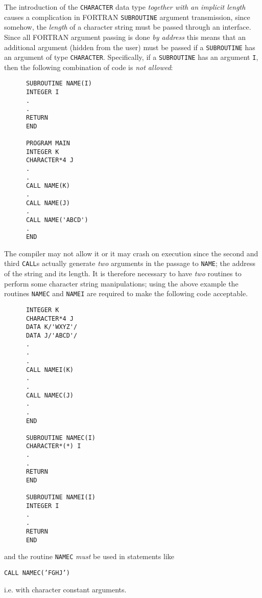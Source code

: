 The introduction of the {\tt CHARACTER}
data type {\em together with an implicit length} causes a 
complication in FORTRAN {\tt SUBROUTINE} argument transmission, since
somehow, the {\em length} of a character string must be passed
through an interface. Since all FORTRAN argument passing is done
{\em by address} this means that an additional argument (hidden from
the user) must be passed if a {\tt SUBROUTINE} has an argument of
type {\tt CHARACTER}.
Specifically, if a {\tt SUBROUTINE} has an argument {\tt I}, then the
following combination of code is {\em not allowed}:
\newpage
\begin{verbatim}
      SUBROUTINE NAME(I)
      INTEGER I
      .
      .
      RETURN
      END
      
      PROGRAM MAIN
      INTEGER K
      CHARACTER*4 J
      .
      .
      CALL NAME(K)
      .
      CALL NAME(J)
      .
      CALL NAME('ABCD')
      .
      END
\end{verbatim}
The compiler may not allow it or it may crash on execution
since the second and third {\tt CALL}s actually generate {\em two}
arguments in the passage to {\tt NAME}; the address of the string and its
length. It is therefore necessary to have {\em two}
routines to perform some character string manipulations; using the 
above example the routines {\tt NAMEC} and {\tt NAMEI} are required to
make the following code acceptable.
\newpage
\begin{verbatim}
      INTEGER K
      CHARACTER*4 J
      DATA K/'WXYZ'/
      DATA J/'ABCD'/
      .
      .
      .
      CALL NAMEI(K)
      .
      .
      CALL NAMEC(J)
      .
      .
      END
      
      SUBROUTINE NAMEC(I)
      CHARACTER*(*) I
      .
      .
      RETURN
      END
      
      SUBROUTINE NAMEI(I)
      INTEGER I
      .
      .
      RETURN
      END
\end{verbatim}
and the routine {\tt NAMEC} {\em must} be used in statements like \\
\begin{center}
{\tt CALL NAMEC('FGHJ')}
\end{center}
i.e. with character constant arguments.

